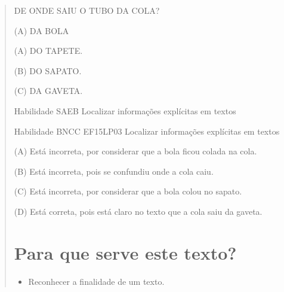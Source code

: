 {{{{\begin{verse}
{DE ONDE SAIU O TUBO DA COLA?

(A) DA BOLA

(A) DO TAPETE.

(B) DO SAPATO.

(C) DA GAVETA.

Habilidade SAEB Localizar informações explícitas em textos

Habilidade BNCC EF15LP03 Localizar informações explícitas em textos

(A) Está incorreta, por considerar que a bola ficou colada na cola.

(B) Está incorreta, pois se confundiu onde a cola caiu.

(C) Está incorreta, por considerar que a bola colou no sapato.

(D) Está correta, pois está claro no texto que a cola saiu da gaveta.

\chapter{Para que serve este texto?}



\begin{itemize}
\item Reconhecer a finalidade de um texto.
\end{itemize}

}
\end{verse}}}}}
